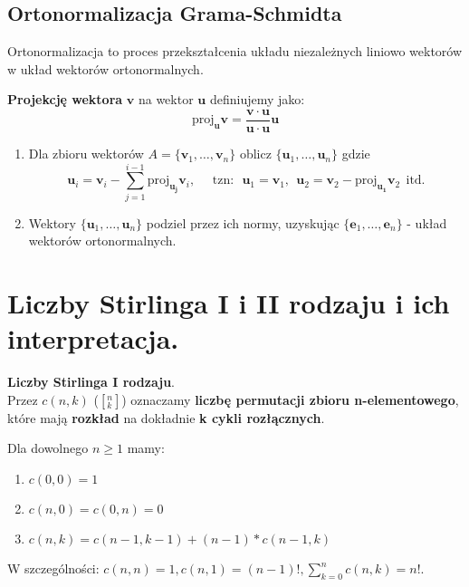 \documentclass[main.tex]{subfiles}
\begin{document}
    \newpage
    \subsection{Ortonormalizacja Grama-Schmidta}

    Ortonormalizacja to proces przekształcenia układu niezależnych liniowo wektorów w układ wektorów ortonormalnych.

    \noindent \textbf{Projekcję wektora} $\mathbf{v}$ na wektor $\mathbf{u}$ definiujemy jako:
    \[\mathrm{proj}_\mathbf{u} \mathbf{v} = \frac{\mathbf{v} \cdot \mathbf{u}}{\mathbf{u} \cdot \mathbf{u}} \mathbf{u}\]

    \begin{enumerate}
        \item Dla zbioru wektorów $A = \{\mathbf{v}_1, \dots,  \mathbf{v}_n\}$ oblicz
        $\{{\mathbf{u}_1, \ldots, \mathbf{u}_n}\}$ gdzie
        \[\mathbf{u}_i = \mathbf{v}_i - \sum_{j=1}^{i-1} \mathrm{proj}_\mathbf{u_j} \mathbf{v}_i, ~~~~~~ \text{tzn:} ~~~
        \mathbf{u}_1 = \mathbf{v}_1, ~~ \mathbf{u}_2 = \mathbf{v}_2 - \mathrm{proj}_\mathbf{u_1} \mathbf{v}_2 ~~ \text{itd.}
        \]

        \item Wektory $\{{\mathbf{u}_1, \ldots, \mathbf{u}_n}\}$ podziel przez ich normy, uzyskując
        $\{{\mathbf{e}_1, \ldots, \mathbf{e}_n}\}$ - układ wektorów ortonormalnych.
    \end{enumerate}


    \section{Liczby Stirlinga I i II rodzaju i ich interpretacja.}

    \begin{definition}
        \textbf{Liczby Stirlinga I rodzaju}.\\
        Przez $c(n,k)$ ($[^n_k]$) oznaczamy \textbf{liczbę permutacji zbioru n-elementowego}, które mają \textbf{rozkład}
        na dokładnie \textbf{k cykli rozłącznych}.

        Dla dowolnego $n \geq 1$ mamy:
        \begin{enumerate}
            \item $c(0,0) = 1$
            \item $c(n,0) = c(0,n) = 0$
            \item $c(n,k) = c(n-1, k-1) + (n-1) * c(n-1, k)$
        \end{enumerate}
        W szczególności: $c(n,n) = 1, c(n,1) = (n-1)!, \sum^n_{k=0} c(n,k) = n!$.
    \end{definition}
\end{document}
